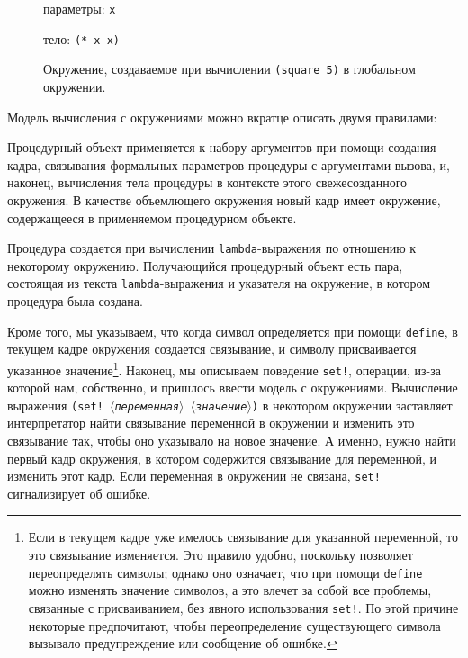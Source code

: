 \begin{figure}
\begin{center}

\end{center}
\hspace{5cm}параметры: {\tt x} 

\hspace{5cm}тело: {\tt (* x x)}
\caption{Окружение, создаваемое при вычислении
{\tt (square 5)} в глобальном окружении.}
\label{P3.3}

\end{figure}

Модель вычисления с окружениями можно вкратце описать двумя
правилами:

\begin{plainlist}


\item
Процедурный объект применяется к набору аргументов
при помощи создания кадра, связывания формальных параметров процедуры
с аргументами вызова, и, наконец, вычисления тела процедуры в
контексте этого свежесозданного окружения.  В качестве объемлющего
окружения новый кадр имеет окружение, содержащееся в применяемом
процедурном объекте.

\item
{}Процедура создается при вычислении
{\tt lambda}-выражения
по отношению к некоторому окружению.
Получающийся процедурный объект есть пара, состоящая из текста
{\tt lambda}-выражения и указателя на окружение, в котором
процедура была создана.
\end{plainlist}

Кроме того, мы указываем, что когда символ определяется при
помощи {\tt define},
в текущем кадре
окружения создается  связывание, и символу присваивается указанное
значение\footnote{Если в текущем кадре уже имелось связывание для указанной
переменной, то это связывание изменяется.  Это правило удобно,
поскольку позволяет переопределять символы; однако оно означает, что
при помощи {\tt define} можно изменять значение символов, а это
влечет за собой все проблемы, связанные с присваиванием, без явного
использования 
{\tt set!}. По этой причине некоторые
предпочитают, чтобы переопределение существующего символа вызывало
предупреждение или сообщение об ошибке.
}.
Наконец, мы описываем поведение
{\tt set!}, операции, из-за которой нам, собственно, и пришлось
ввести модель с окружениями.  Вычисление выражения {\tt (set!
\textit{$\langle$переменная$\rangle$} \textit{$\langle$значение$\rangle$})} в
некотором окружении заставляет интерпретатор найти связывание
переменной в окружении и изменить это связывание так, чтобы оно
указывало на новое значение.  А именно, нужно найти первый кадр
окружения, в котором содержится связывание для переменной, и изменить
этот кадр.  Если переменная в окружении не связана, {\tt set!}
сигнализирует об ошибке.

